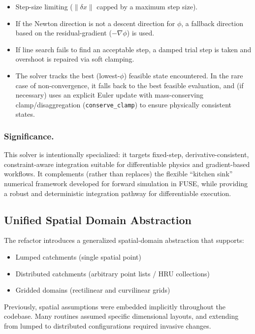 \documentclass[11pt]{scrartcl}
\begin{document}
\begin{itemize}
\item Step-size limiting (\(\|\delta x\|\) capped by a maximum step size).
\item If the Newton direction is not a descent direction for \(\phi\), a fallback direction
      based on the residual-gradient (\(-\nabla \phi\)) is used.
\item If line search fails to find an acceptable step, a damped trial step is taken and
      overshoot is repaired via soft clamping.
\item The solver tracks the best (lowest-\(\phi\)) feasible state encountered. In the rare
      case of non-convergence, it falls back to the best feasible evaluation, and (if
      necessary) uses an explicit Euler update with mass-conserving clamp/disaggregation
      (\texttt{conserve\_clamp}) to ensure physically consistent states.
\end{itemize}

\subsubsection{Significance.}
This solver is intentionally specialized: it targets fixed-step, derivative-consistent,
constraint-aware integration suitable for differentiable physics and gradient-based
workflows. It complements (rather than replaces) the flexible ``kitchen sink'' numerical
framework developed for forward simulation in FUSE, while providing a robust and
deterministic integration pathway for differentiable execution.

\subsection{Unified Spatial Domain Abstraction}

The refactor introduces a generalized spatial-domain abstraction that supports:

\begin{itemize}
\item Lumped catchments (single spatial point)
\item Distributed catchments (arbitrary point lists / HRU collections)
\item Gridded domains (rectilinear and curvilinear grids)
\end{itemize}

Previously, spatial assumptions were embedded implicitly throughout the codebase.
Many routines assumed specific dimensional layouts, and extending from lumped to
distributed configurations required invasive changes.
\end{document}
